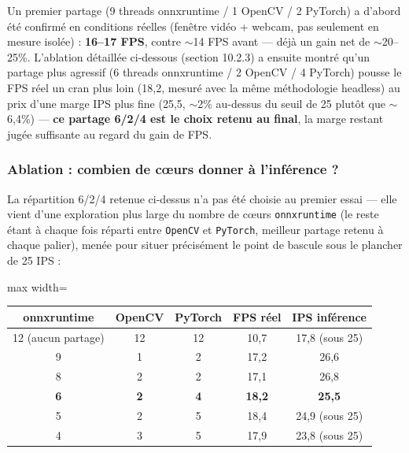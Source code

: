 \documentclass[11pt,a4paper]{article}
\let\Oldsubsubsection\subsubsection
\renewcommand{\subsubsection}{\FloatBarrier\Oldsubsubsection}
\begin{document}
    Un premier partage (9 threads onnxruntime / 1 OpenCV / 2 PyTorch) a
    d'abord été confirmé en conditions réelles (fenêtre vidéo + webcam, pas
    seulement en mesure isolée) : \textbf{16--17 FPS}, contre $\sim$14 FPS
    avant --- déjà un gain net de $\sim$20--25\%. L'ablation détaillée
    ci-dessous (section 10.2.3) a ensuite montré qu'un partage plus agressif
    (6 threads onnxruntime / 2 OpenCV / 4 PyTorch) pousse le FPS réel un
    cran plus loin (18,2, mesuré avec la même méthodologie headless) au prix
    d'une marge IPS plus fine (25,5, $\sim$2\% au-dessus du seuil de 25
    plutôt que $\sim$6,4\%) --- \textbf{ce partage 6/2/4 est le choix
    retenu au final}, la marge restant jugée suffisante au regard du gain de
    FPS.
    
    \subsubsection{Ablation : combien de cœurs donner à l'inférence ?}
    
    La répartition 6/2/4 retenue ci-dessus n'a pas été choisie au premier
    essai --- elle vient d'une exploration plus large du nombre de cœurs
    \texttt{onnxruntime} (le reste étant à chaque fois réparti entre
    \texttt{OpenCV} et \texttt{PyTorch}, meilleur partage retenu à chaque
    palier), menée pour situer précisément le point de bascule sous le
    plancher de 25 IPS :
    
    \begin{table}[!htbp]
    \centering
    \small
    \begin{adjustbox}{max width=\linewidth}
    \begin{tabular}{@{}ccccc@{}}
    \toprule
    \textbf{onnxruntime} & \textbf{OpenCV} & \textbf{PyTorch} & \textbf{FPS réel} & \textbf{IPS inférence} \\
    \midrule
    12 (aucun partage) & 12 & 12 & 10,7 & 17,8 (sous 25) \\
    9 & 1 & 2 & 17,2 & 26,6 \\
    8 & 2 & 2 & 17,1 & 26,8 \\
    \textbf{6} & \textbf{2} & \textbf{4} & \textbf{18,2} & \textbf{25,5} \\
    5 & 2 & 5 & 18,4 & 24,9 (sous 25) \\
    4 & 3 & 5 & 17,9 & 23,8 (sous 25) \\
    \bottomrule
    \end{tabular}
    \end{adjustbox}
    \end{table}
    
\end{document}
